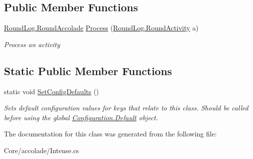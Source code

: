 \subsection*{Public Member Functions}
\begin{DoxyCompactItemize}
\item 
\hypertarget{class_m_b_c_1_1_core_1_1mbc_1_1accolade_1_1_intense_ae3a4c37d563f8c4e1399e75ffdb10866}{\hyperlink{class_m_b_c_1_1_core_1_1_round_log_a4060830ca7135aa755ec5b6d24aa30e6}{Round\-Log.\-Round\-Accolade} \hyperlink{class_m_b_c_1_1_core_1_1mbc_1_1accolade_1_1_intense_ae3a4c37d563f8c4e1399e75ffdb10866}{Process} (\hyperlink{class_m_b_c_1_1_core_1_1_round_log_1_1_round_activity}{Round\-Log.\-Round\-Activity} a)}\label{class_m_b_c_1_1_core_1_1mbc_1_1accolade_1_1_intense_ae3a4c37d563f8c4e1399e75ffdb10866}

\begin{DoxyCompactList}\small\item\em Process an activity\end{DoxyCompactList}\end{DoxyCompactItemize}
\subsection*{Static Public Member Functions}
\begin{DoxyCompactItemize}
\item 
\hypertarget{class_m_b_c_1_1_core_1_1mbc_1_1accolade_1_1_intense_a337befbf2d6bb77f1b69c3141dd22ef6}{static void \hyperlink{class_m_b_c_1_1_core_1_1mbc_1_1accolade_1_1_intense_a337befbf2d6bb77f1b69c3141dd22ef6}{Set\-Config\-Defaults} ()}\label{class_m_b_c_1_1_core_1_1mbc_1_1accolade_1_1_intense_a337befbf2d6bb77f1b69c3141dd22ef6}

\begin{DoxyCompactList}\small\item\em Sets default configuration values for keys that relate to this class. Should be called before using the global \hyperlink{class_m_b_c_1_1_core_1_1_configuration_a5db184730b6c51c2ae617d0fc1976c13}{Configuration.\-Default} object.\end{DoxyCompactList}\end{DoxyCompactItemize}


The documentation for this class was generated from the following file\-:\begin{DoxyCompactItemize}
\item 
Core/accolade/Intense.\-cs\end{DoxyCompactItemize}

